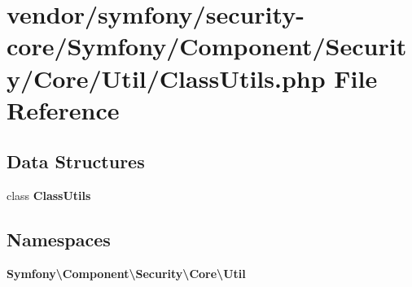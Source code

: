 \section{vendor/symfony/security-\/core/\+Symfony/\+Component/\+Security/\+Core/\+Util/\+Class\+Utils.php File Reference}
\label{_class_utils_8php}
\subsection*{Data Structures}
\begin{DoxyCompactItemize}
\item 
class {\bf Class\+Utils}
\end{DoxyCompactItemize}
\subsection*{Namespaces}
\begin{DoxyCompactItemize}
\item 
 {\bf Symfony\textbackslash{}\+Component\textbackslash{}\+Security\textbackslash{}\+Core\textbackslash{}\+Util}
\end{DoxyCompactItemize}
